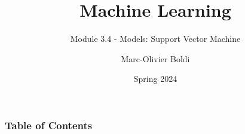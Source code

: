 
\title{Machine Learning}
\subtitle{Module 3.4 - Models: Support Vector Machine}
\author[MOB]{Marc-Olivier Boldi}
\date[Spring 2024]{Spring 2024}

\begin{frame}
  \titlepage
\end{frame}
\begin{frame}
\frametitle{Table of Contents}
	\tableofcontents
\end{frame}
